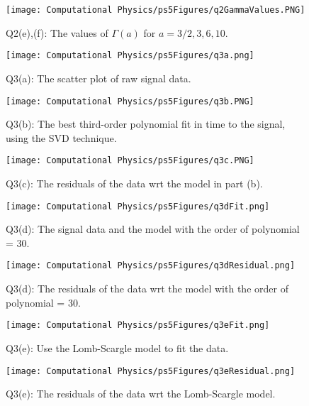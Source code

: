 \documentclass[11pt]{article}
\begin{document}
\begin{figure}[b!]
\centering
\texttt{[image: Computational Physics/ps5Figures/q2GammaValues.PNG]}
\caption{Q2(e),(f): The values of $\Gamma(a)$ for $a=3/2, 3, 6, 10$.}
  \label{fig:Q2GammaValues}
\end{figure}

\begin{figure}[b!]
\centering
\texttt{[image: Computational Physics/ps5Figures/q3a.png]}
\caption{Q3(a): The scatter plot of raw signal data.}
  \label{fig:Q3a}
\end{figure}

\begin{figure}[b!]
\centering
\texttt{[image: Computational Physics/ps5Figures/q3b.PNG]}
\caption{Q3(b): The best third-order polynomial fit in time to the signal, using the SVD technique.}
  \label{fig:Q3b}
\end{figure}

\begin{figure}[b!]
\centering
\texttt{[image: Computational Physics/ps5Figures/q3c.PNG]}
\caption{Q3(c): The residuals of the data wrt the model in part (b).}
  \label{fig:Q3c}
\end{figure}

\begin{figure}[b!]
\centering
\texttt{[image: Computational Physics/ps5Figures/q3dFit.png]}
\caption{Q3(d): The signal data and the model with the order of polynomial = 30.}
  \label{fig:Q3dFit}
\end{figure}

\begin{figure}[b!]
\centering
\texttt{[image: Computational Physics/ps5Figures/q3dResidual.png]}
\caption{Q3(d): The residuals of the data wrt the model with the order of polynomial = 30.}
  \label{fig:Q3dResidual}
\end{figure}

\begin{figure}[b!]
\centering
\texttt{[image: Computational Physics/ps5Figures/q3eFit.png]}
\caption{Q3(e): Use the Lomb-Scargle model to fit the data.}
  \label{fig:Q3eFit}
\end{figure}

\begin{figure}[b!]
\centering
\texttt{[image: Computational Physics/ps5Figures/q3eResidual.png]}
\caption{Q3(e): The residuals of the data wrt the Lomb-Scargle model.}
  \label{fig:Q3eResidual}
\end{figure}



\end{document}
